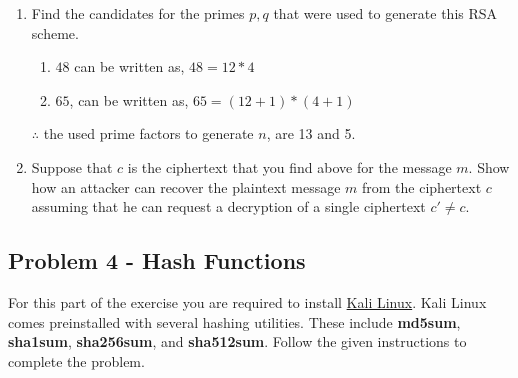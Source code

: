 \documentclass[11pt,letterpaper]{article}
\newenvironment{answer}{\em \color{blue} \begin{adjustwidth}{1cm}{1cm}}{\end{adjustwidth}}
\begin{document}
\begin{enumerate}
\begin{answer}
\begin{enumerate}
			\item Decryption
			\[
			\begin{split}
				plaintext &= c^d ~mod~65\\
				&=60^7~mod~65\\
				&= \left\{ \left( 60^2~mod~65 \right)* \left( 60^2~mod~65 \right)* \left( 60^2~mod~65 \right) * \left( 60^1~mod~65 \right) \right\} ~mod ~65\\
				&= \left\{ \left( 25 \right)* \left( 25 \right)* \left( 25 \right) * \left( 60 \right) \right\} ~mod ~65\\
				&=5~ \because (25^3 * 60 = 14423*65 + 5)
			\end{split}
			\]

		\end{enumerate}
	$\therefore$ the plaintext can be recovered at the receiver after decrypting.
	\end{answer}

		\item Find the candidates for the primes $p,q$ that were used to generate this RSA scheme.
		
		\begin{answer}
			\begin{enumerate}
				\item $48$ can be written as, $48 = 12 * 4$
				\item $65$, can be written as, $65 = \left( 12 + 1 \right) * \left( 4 + 1\right)$
			\end{enumerate}
		$\therefore$ the used prime factors to generate $n$, are 13 and 5.
		\end{answer}
		
		\item Suppose that $c$ is the ciphertext that you find above for the message $m$. Show how an attacker can recover the plaintext message $m$ from the ciphertext $c$ assuming that he can request a decryption of a single ciphertext $c' \neq c$. 
	\end{enumerate}
	
	\subsection*{Problem 4 - Hash Functions}
	
	{For this part of the exercise you are required to install \href{https://www.kali.org/get-kali/#kali-platforms}{Kali Linux}. Kali Linux comes preinstalled with several hashing utilities. These include \textbf{md5sum}, \textbf{sha1sum},
		\textbf{sha256sum}, and \textbf{sha512sum}. Follow the given instructions to complete the problem.}
	
\end{document}
